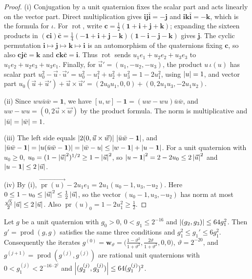 \begin{proof}
(i) Conjugation by a unit quaternion fixes the scalar part and acts linearly on
the vector part. Direct multiplication gives
$\mathbf i\mathbf j\bar{\mathbf i}=-\mathbf j$ and
$\mathbf i\mathbf k\bar{\mathbf i}=-\mathbf k$, which is the formula for $\iota$. For
$\operatorname{rot}$, write $\mathbf c=\frac12(\mathbf1+\mathbf i+\mathbf j+\mathbf k)$; expanding the
sixteen products in $(\mathbf c\mathbf i)\bar{\mathbf c}=\frac14(-\mathbf1+\mathbf i+
\mathbf j-\mathbf k)(\mathbf1-\mathbf i-\mathbf j-\mathbf k)$ gives $\mathbf j$. The
cyclic permutation $\mathbf i\mapsto\mathbf j\mapsto\mathbf k\mapsto\mathbf i$ is an
automorphism of the quaternions fixing $\mathbf c$, so also
$\mathbf c\mathbf j\bar{\mathbf c}=\mathbf k$ and $\mathbf c\mathbf k\bar{\mathbf c}=\mathbf i$.
Thus $\operatorname{rot}$ sends $u_1e_1+u_2e_2+u_3e_3$ to $u_1e_2+u_2e_3+u_3e_1$. Finally, for
$\vec u'=(u_1,-u_2,-u_3)$, the product $u\,\iota(u)$ has scalar part
$u_0^2-\vec u\cdot\vec u'=u_0^2-u_1^2+u_2^2+u_3^2=1-2u_1^2$, using $\left\lvert u\right\rvert=1$, and
vector part $u_0(\vec u+\vec u')+\vec u\times\vec u'=(2u_0u_1,0,0)+(0,2u_1u_3,-2u_1u_2)$.

(ii) Since $wu\bar u\bar w=\mathbf1$, we have
$[u,w]-\mathbf1=(uw-wu)\bar u\bar w$, and $uw-wu=(0,2\vec u\times\vec w)$ by the
product formula. The norm is multiplicative and $\left\lvert\bar u\right\rvert=\left\lvert\bar w\right\rvert=1$.

(iii) The left side equals $\left\lvert2(0,\vec u\times\vec w)\right\rvert\,\left\lvert\bar u\bar w-\mathbf1\right\rvert$,
and $\left\lvert\bar u\bar w-\mathbf1\right\rvert=\left\lvert u(\bar u\bar w-\mathbf1)\right\rvert=\left\lvert\bar w-u\right\rvert
\le\left\lvert w-\mathbf1\right\rvert+\left\lvert u-\mathbf1\right\rvert$. For a unit quaternion with $u_0\ge0$,
$u_0=(1-\left\lvert\vec u\right\rvert^2)^{1/2}\ge1-\left\lvert\vec u\right\rvert^2$, so
$\left\lvert u-\mathbf1\right\rvert^2=2-2u_0\le2\left\lvert\vec u\right\rvert^2$ and $\left\lvert u-\mathbf1\right\rvert\le2\left\lvert\vec u\right\rvert$.

(iv) By (i), $\overrightarrow{\operatorname{pr}(u)}-2u_1e_1=2u_1(u_0-1,u_3,-u_2)$. Here
$0\le1-u_0\le\left\lvert\vec u\right\rvert^2\le\frac12\left\lvert\vec u\right\rvert$, so the vector
$(u_0-1,u_3,-u_2)$ has norm at most $\frac{\sqrt5}2\left\lvert\vec u\right\rvert\le2\left\lvert\vec u\right\rvert$.
Also $\operatorname{pr}(u)_0=1-2u_1^2\ge\frac12$.
\end{proof}

\begin{lemma}
\label{lem:reductions-generator}
Let $g$ be a unit quaternion with $g_0>0$, $0<g_1\le2^{-16}$ and
$\left\lvert(g_2,g_3)\right\rvert\le64g_1^2$. Then $g'=\operatorname{prod}(g,g)$ satisfies the same three
conditions and $g_1^2\le g_1'\le6g_1^2$. Consequently the iterates
$g^{(0)}=\mathbf w_\vartheta=\bigl(\frac{1-\vartheta^2}{1+\vartheta^2},
\frac{2\vartheta}{1+\vartheta^2},0,0\bigr)$, $\vartheta=2^{-20}$, and
$g^{(j+1)}=\operatorname{prod}(g^{(j)},g^{(j)})$ are rational unit quaternions with
$0<g^{(j)}_1<2^{-16\cdot2^j}$ and $\left\lvert(g^{(j)}_2,g^{(j)}_3)\right\rvert\le64(g^{(j)}_1)^2$.
\end{lemma}

